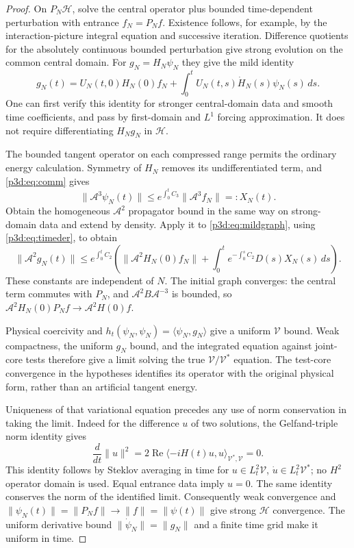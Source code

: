 \documentclass[11pt]{article}
\numberwithin{equation}{section}
\theoremstyle{definition}
\theoremstyle{remark}
\begin{document}
\begin{proof}
On $P_N\mathcal H$, solve the central operator plus bounded
time-dependent perturbation with entrance $f_N=P_Nf$. Existence follows,
for example, by the interaction-picture integral equation and successive
iteration. Difference quotients for the absolutely continuous bounded
perturbation give strong evolution on the common central domain.
For $g_N=H_N\psi_N$ they give the mild identity
\begin{equation}\label{p3d:eq:mildgraph}
 g_N(t)=U_N(t,0)H_N(0)f_N+
              \int_0^tU_N(t,s)\dot H_N(s)\psi_N(s)\,ds.
\end{equation}
One can first verify this identity for stronger central-domain data and
smooth time coefficients, and pass by first-domain and $L^1$ forcing
approximation. It does not require differentiating $H_Ng_N$ in $\mathcal H$.

The bounded tangent operator on each compressed range permits the
ordinary energy calculation. Symmetry of $H_N$ removes its undifferentiated
term, and \eqref{p3d:eq:comm} gives
\[
 \|\mathcal A^3\psi_N(t)\|
 \leq e^{\int_0^t C_3}\|\mathcal A^3f_N\|=:X_N(t).
\]
Obtain the homogeneous $\mathcal A^2$ propagator bound in the same way
on strong-domain data and extend by density. Apply it to
\eqref{p3d:eq:mildgraph}, using \eqref{p3d:eq:timeder}, to obtain
\begin{equation}\label{p3d:eq:graphbound}
 \|\mathcal A^2g_N(t)\|
 \leq e^{\int_0^t C_2}
 \left(\|\mathcal A^2H_N(0)f_N\|
 +\int_0^t e^{-\int_0^s C_2}D(s)X_N(s)\,ds\right).
\end{equation}
These constants are independent of $N$.
The initial graph converges: the central term commutes with $P_N$, and
$\mathcal A^2B\mathcal A^{-3}$ is bounded, so
$\mathcal A^2H_N(0)P_Nf\to\mathcal A^2H(0)f$.

Physical coercivity and
$h_t(\psi_N,\psi_N)=\langle\psi_N,g_N\rangle$ give a uniform
$\mathcal V$ bound. Weak compactness, the uniform $g_N$ bound,
and the integrated equation against joint-core tests therefore give a
limit solving the true $\mathcal V/\mathcal V^*$ equation. The
test-core convergence in the hypotheses identifies its operator with
the original physical form, rather than an artificial tangent energy.

Uniqueness of that variational equation precedes any use of norm
conservation in taking the limit. Indeed for the difference $u$ of two
solutions, the Gelfand-triple norm identity gives
\[
 \frac{d}{dt}\|u\|^2
 =2\operatorname{Re}\langle-iH(t)u,u\rangle_{\mathcal V^*,\mathcal V}=0.
\]
This identity follows by Steklov averaging in time for
$u\in L^2_t\mathcal V$, $\dot u\in L^2_t\mathcal V^*$;
no $H^2$ operator domain is used. Equal entrance data imply $u=0$.
The same identity conserves the norm of the identified limit.
Consequently weak convergence and
$\|\psi_N(t)\|=\|P_Nf\|\to\|f\|=\|\psi(t)\|$
give strong $\mathcal H$ convergence. The uniform derivative bound
$\|\dot\psi_N\|=\|g_N\|$ and a finite time grid make it uniform in time.


\end{proof}
\end{document}
